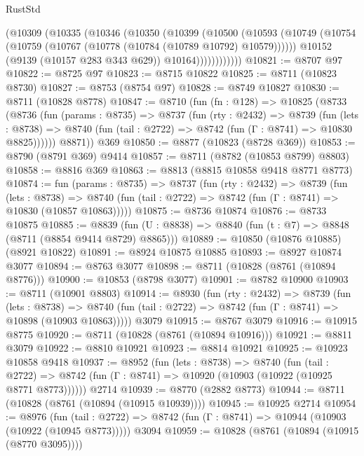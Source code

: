 \begin{lexlean}{RustStd}
\begin{coremodule}
              (@10309
                (@10335
                  (@10346
                    (@10350
                      (@10399
                        (@10500
                          (@10593
                            (@10749
                              (@10754 (@10759 (@10767 (@10778 (@10784 (@10789 @10792) @10579))))))
                            @10152
                            (@9139 (@10157 @283 @343 @629))
                            @10164))))))))))))
@10821 := @8707 @97
@10822 := @8725 @97
@10823 := @8715 @10822
@10825 := @8711 (@10823 @8730)
@10827 := @8753 (@8754 @97)
@10828 := @8749 @10827
@10830 := @8711 (@10828 @8778)
@10847 := @8710
    (fun (fn : @128) =>
    @10825
      (@8733
        (@8736
          (fun (params : @8735) =>
          @8737
            (fun (rty : @2432) =>
            @8739
              (fun (lets : @8738) =>
              @8740 (fun (tail : @2722) => @8742 (fun (Γ : @8741) => @10830 @8825))))))
        @8871))
    @369
@10850 := @8877 (@10823 (@8728 @369))
@10853 := @8790 (@8791 @369) @9414
@10857 := @8711 (@8782 (@10853 @8799) @8803)
@10858 := @8816 @369
@10863 := @8813 (@8815 @10858 @9418 @8771 @8773)
@10874 := fun (params : @8735) =>
  @8737
    (fun (rty : @2432) =>
    @8739
      (fun (lets : @8738) =>
      @8740 (fun (tail : @2722) => @8742 (fun (Γ : @8741) => @10830 (@10857 @10863)))))
@10875 := @8736 @10874
@10876 := @8733 @10875
@10885 := @8839 (fun (U : @8838) => @8840 (fun (t : @7) => @8848 (@8711 (@8854 @9414 @8729) @8865)))
@10889 := @10850 (@10876 @10885) (@8921 @10822)
@10891 := @8924 @10875 @10885
@10893 := @8927 @10874 @3077
@10894 := @8763 @3077
@10898 := @8711 (@10828 (@8761 (@10894 @8776)))
@10900 := @10853 (@8798 @3077)
@10901 := @8782 @10900
@10903 := @8711 (@10901 @8803)
@10914 := @8930
    (fun (rty : @2432) =>
    @8739
      (fun (lets : @8738) =>
      @8740 (fun (tail : @2722) => @8742 (fun (Γ : @8741) => @10898 (@10903 @10863)))))
    @3079
@10915 := @8767 @3079
@10916 := @10915 @8775
@10920 := @8711 (@10828 (@8761 (@10894 @10916)))
@10921 := @8811 @3079
@10922 := @8810 @10921
@10923 := @8814 @10921
@10925 := @10923 @10858 @9418
@10937 := @8952
    (fun (lets : @8738) =>
    @8740
      (fun (tail : @2722) =>
      @8742 (fun (Γ : @8741) => @10920 (@10903 (@10922 (@10925 @8771 @8773))))))
    @2714
@10939 := @8770 (@2882 @8773)
@10944 := @8711 (@10828 (@8761 (@10894 (@10915 @10939))))
@10945 := @10925 @2714
@10954 := @8976
    (fun (tail : @2722) => @8742 (fun (Γ : @8741) => @10944 (@10903 (@10922 (@10945 @8773)))))
    @3094
@10959 := @10828 (@8761 (@10894 (@10915 (@8770 @3095))))

\end{coremodule}
\end{lexlean}

